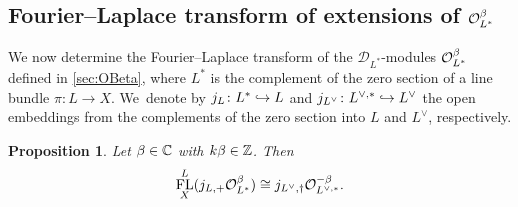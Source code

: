 \documentclass[11pt]{article}
\newcommand\hto{\mathrel{\lhook\joinrel\to}}
\newtheorem{prop}[thm]{Proposition}
\DeclareMathOperator{\FL}{\textup{FL}}
\begin{document}
\subsection{Fourier--Laplace transform of extensions of \texorpdfstring{$\mathcal{O}_{L^{*}}^\beta$}{O\_\{L\textasciicircum*\}\textasciicircum\textbackslash beta}}

We now determine the Fourier--Laplace transform of the $\mathscr{D}_{L^*}$\nobreakdash-mod\-ules $\mathcal{O}_{L^*}^\beta$ defined in \cref{sec:OBeta}, where $L^*$ is the complement of the zero section of a line bundle $\pi \colon L \to X$. We~denote by $j_L \colon L^* \hto L$ and $j_{L^\vee} \colon L^{\vee,*} \hto L^\vee$ the open embeddings from the complements of the zero section into $L$ and $L^\vee$, respectively.

\begin{prop} \label{prop:FLofObeta}
Let $\beta \in {\mathbb C}$ with $k\beta \in {\mathbb Z}$. Then
\[
\FL_X^{L}(j_{L,+} \O_{L^{*}}^{\beta}) \cong j_{L^\vee,\dag} \O_{L^{\vee,*}}^{-\beta}.
\]
\end{prop}
\end{document}
